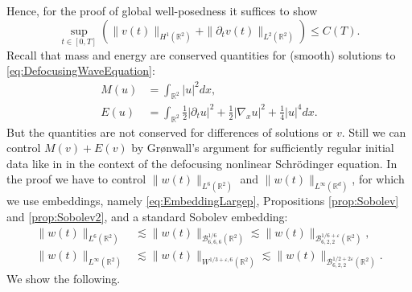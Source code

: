 \documentclass{amsart}
\theoremstyle{definition}
\newcommand{\R}{\mathbb{R}}
\newcommand {\Rd}{\mathbb{R}^{d}}
\newcommand {\Rtwo}{\mathbb{R}^{2}}
\newcommand {\veps}{\varepsilon}
\numberwithin{equation}{section}
\begin{document}
Hence, for the proof of global well-posedness it suffices to show
\begin{equation*}
\sup_{t \in [0,T]} (\| v(t) \|_{H^{1}(\R^2)} + \| \partial_t v(t) \|_{L^2(\Rtwo)}) \leq C(T).
\end{equation*}
Recall that mass and energy are conserved quantities for (smooth) solutions to \eqref{eq:DefocusingWaveEquation}:
\begin{align}
\label{eq:Mass}
M(u) &= \int_{\R^2} |u|^2 dx, \\
\label{eq:Energy}
E(u) &= \int_{\R^2} \frac{1}{2} |\partial_t u|^2 + \frac{1}{2} |\nabla_x u|^2 + \frac{1}{4} |u|^4 dx.
\end{align}
But the quantities are not conserved for differences of solutions or $v$. Still we can control $M(v)+E(v)$ by Gr\o nwall's argument for sufficiently regular initial data like in \cite{DodsonSofferSpencer2021,Schippa2022} in the context of the defocusing nonlinear Schr\"odinger equation.
In the proof we have to control $\| w(t) \|_{L^6(\R^2)}$ and $\| w(t) \|_{L^\infty(\Rd)}$, for which we use embeddings, namely \eqref{eq:EmbeddingLargep}, Propositions \ref{prop:Sobolev} and \ref{prop:Sobolev2}, and a standard Sobolev embedding:
\begin{align*}
\| w(t) \|_{L^6(\R^2)} &\lesssim \| w(t) \|_{\mathcal{B}^{1/6}_{6,6,6}(\Rtwo)} \lesssim \| w(t) \|_{\mathcal{B}^{1/6+\veps}_{6,2,2}(\R^2)}, \\
\| w(t) \|_{L^\infty(\R^2)} &\lesssim \|w(t) \|_{W^{1/3+\veps,6}(\R^2)} \lesssim \| w(t) \|_{\mathcal{B}^{1/2+2\varepsilon}_{6,2,2}(\R^2)}.
\end{align*}
We show the following.
\end{document}
